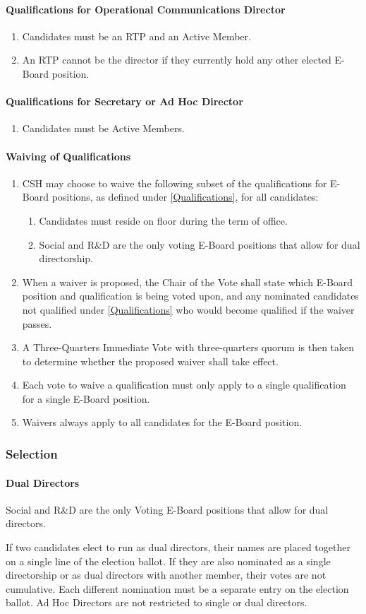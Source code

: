 \documentclass{article}
\newcommand{\asubsection}[1]{\subsubsection{#1} \label{#1}}
\newcommand{\asubsubsection}[1]{\paragraph{#1} \label{#1}}
\begin{document}
\asubsubsection{Qualifications for Operational Communications Director}
\begin{enumerate}
	\item Candidates must be an RTP and an Active Member.
	\item An RTP cannot be the director if they currently hold any other elected E-Board position. %
\end{enumerate}

\asubsubsection{Qualifications for Secretary or Ad Hoc Director}
\begin{enumerate}
	\item Candidates must be Active Members.
\end{enumerate}

\asubsubsection{Waiving of Qualifications}
\begin{enumerate}
	\item CSH may choose to waive the following subset of the qualifications for E-Board positions, as defined under \ref{Qualifications}, for all candidates:
	      \begin{enumerate}
		      \item Candidates must reside on floor during the term of office.
		      \item Social and R\&D are the only voting E-Board positions that allow for dual directorship.
	      \end{enumerate}
	\item When a waiver is proposed, the Chair of the Vote shall state which E-Board position and qualification is being voted upon, and any nominated candidates not qualified under \ref{Qualifications} who would become qualified if the waiver passes.
	\item A Three-Quarters Immediate Vote with three-quarters quorum is then taken to determine whether the proposed waiver shall take effect.
	\item Each vote to waive a qualification must only apply to a single qualification for a single E-Board position.
	\item Waivers always apply to all candidates for the E-Board position.
\end{enumerate}

\asubsection{Selection}

\asubsubsection{Dual Directors}
Social and R\&D are the only Voting E-Board positions that allow for dual directors.

If two candidates elect to run as dual directors, their names are placed together on a single line of the election ballot.
If they are also nominated as a single directorship or as dual directors with another member, their votes are not cumulative.
Each different nomination must be a separate entry on the election ballot.
Ad Hoc Directors are not restricted to single or dual directors.
\end{document}
